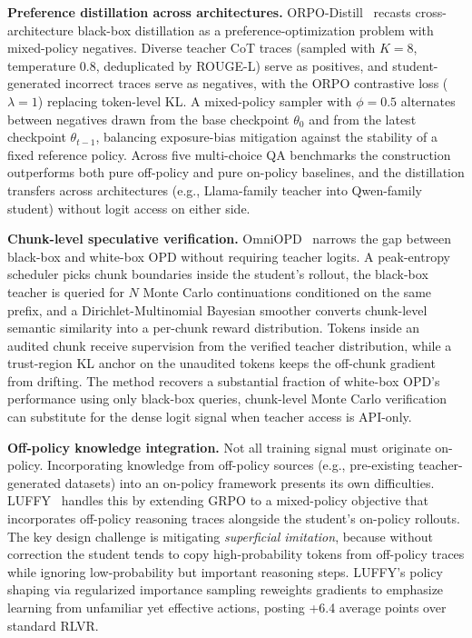 \documentclass{article} %
\begin{document}
\textbf{Preference distillation across architectures.} ORPO-Distill~\citep{2509.25100} recasts cross-architecture black-box distillation as a preference-optimization problem with mixed-policy negatives. Diverse teacher CoT traces (sampled with $K{=}8$, temperature $0.8$, deduplicated by ROUGE-L) serve as positives, and student-generated incorrect traces serve as negatives, with the ORPO contrastive loss ($\lambda{=}1$) replacing token-level KL. A mixed-policy sampler with $\phi{=}0.5$ alternates between negatives drawn from the base checkpoint $\theta_0$ and from the latest checkpoint $\theta_{t-1}$, balancing exposure-bias mitigation against the stability of a fixed reference policy. Across five multi-choice QA benchmarks the construction outperforms both pure off-policy and pure on-policy baselines, and the distillation transfers across architectures (e.g., Llama-family teacher into Qwen-family student) without logit access on either side.

\textbf{Chunk-level speculative verification.} OmniOPD~\citep{2606.01476} narrows the gap between black-box and white-box OPD without requiring teacher logits. A peak-entropy scheduler picks chunk boundaries inside the student's rollout, the black-box teacher is queried for $N$ Monte Carlo continuations conditioned on the same prefix, and a Dirichlet-Multinomial Bayesian smoother converts chunk-level semantic similarity into a per-chunk reward distribution. Tokens inside an audited chunk receive supervision from the verified teacher distribution, while a trust-region KL anchor on the unaudited tokens keeps the off-chunk gradient from drifting. The method recovers a substantial fraction of white-box OPD's performance using only black-box queries, chunk-level Monte Carlo verification can substitute for the dense logit signal when teacher access is API-only.

\textbf{Off-policy knowledge integration.} Not all training signal must originate on-policy. Incorporating knowledge from off-policy sources (e.g., pre-existing teacher-generated datasets) into an on-policy framework presents its own difficulties. LUFFY~\citep{2504.14945} handles this by extending GRPO to a mixed-policy objective that incorporates off-policy reasoning traces alongside the student's on-policy rollouts. The key design challenge is mitigating \emph{superficial imitation}, because without correction the student tends to copy high-probability tokens from off-policy traces while ignoring low-probability but important reasoning steps. LUFFY's policy shaping via regularized importance sampling reweights gradients to emphasize learning from unfamiliar yet effective actions, posting +6.4 average points over standard RLVR.
\end{document}
